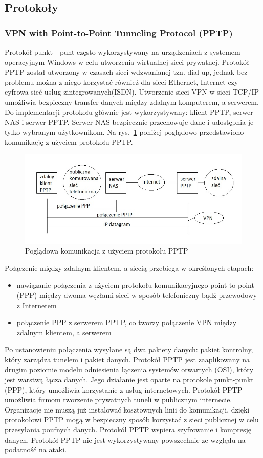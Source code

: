 \documentclass[12p]{article}
\begin{document}
\subsection{Protokoły}
\subsubsection{VPN with Point-to-Point Tunneling Protocol (PPTP)}
\quad Protokół punkt - punt często wykorzystywany na urządzeniach z systemem operacyjnym Windows w celu utworzenia wirtualnej sieci prywatnej. Protokół PPTP został utworzony w czasach sieci wdzwanianej tzn. dial up, jednak bez problemu można z niego korzystać również dla sieci Ethernet, Internet czy cyfrowa sieć usług zintegrowanych(ISDN). Utworzenie sicei VPN w sieci TCP/IP umożliwia bezpieczny transfer danych między zdalnym komputerem, a serwerem. Do implementacji protokołu głównie jest wykorzystywany: klient PPTP, serwer NAS i serwer PPTP. Serwer NAS bezpiecznie przechowuje dane i udostępnia je tylko wybranym użytkownikom. Na rys.~\ref{PPTP} poniżej poglądowo przedstawiono komunikację z użyciem protokołu PPTP. 
\begin{figure}[h]
\centering
\includegraphics[width=12cm]{komunikacja_PPTP.jpg}
\caption{Poglądowa komunikacja z użyciem protokołu PPTP}\label{PPTP}
\end{figure}

Połączenie między zdalnym klientem, a siecią przebiega w określonych etapach:
\begin{itemize}
\item nawiązanie połączenia z użyciem protokołu komunikacyjnego point-to-point (PPP) między dwoma węzłami sieci w sposób telefoniczny bądź przewodowy z Internetem
\item połączenie PPP z serwerem PPTP, co tworzy połączenie VPN między zdalnym klientem, a serwerem
\end{itemize}
Po ustanowieniu połączenia wysyłane są dwa pakiety danych: pakiet kontrolny, który zarządza tunelem i pakiet danych. Protokół PPTP jest zaaplikowany na drugim poziomie modelu odniesienia łączenia systemów otwartych (OSI), który jest warstwą łącza danych. Jego działanie jest oparte na protokole punkt-punkt (PPP), który umożliwia korzystanie z usług internetowych. Protokół PPTP umożliwia firmom tworzenie prywatnych tuneli w publicznym internecie. Organizacje nie muszą już instalować kosztownych linii do komunikacji, dzięki protokołowi PPTP mogą w bezpieczny sposób korzystać z sieci publicznej w celu przesyłania poufnych danych. Protokół PPTP wspiera szyfrowanie i kompresję danych. Protokół PPTP nie jest wykorzystywany powszechnie ze względu na podatność na ataki.~\cite{PPTP}
\end{document}
